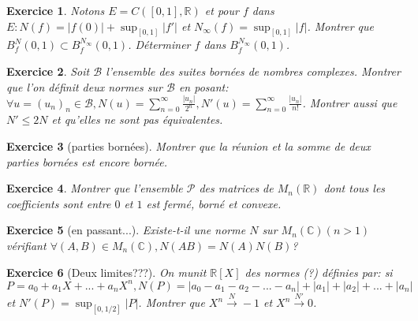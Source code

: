 \documentclass[12pt,a4paper]{article}
\newcommand{\R}{\mathbb{R}}
\newcommand{\C}{\mathbb{C}}
\newcommand{\N}{\mathbb{N}}
\theoremstyle{break}
\theoremstyle{break}
\newtheorem{Exo}{Exercice}
\begin{document}
\begin{Exo}
	Notons $E=C\left([0,1],\R\right)$ et pour $f$ dans $E:N(f)=|f(0)|+\sup_{[0,1]}|f'|$ et $N_{\infty}(f)=\sup_{[0,1]}|f|$. Montrer que $B_f^{N}(0,1)\subset B_f^{N_{\infty}}(0,1)$. Déterminer $f$ dans  $B_f^{N_{\infty}}(0,1)$.
\end{Exo}

\begin{Exo}
	Soit $\mathcal{B}$ l'ensemble des suites bornées de nombres complexes. Montrer que l'on définit deux normes sur $\mathcal{B}$ en posant:
	$\forall u=(u_n)_n\in\mathcal{B},N(u)=\sum_{n=0}^{\infty}\frac{|u_n|}{2^n},N'(u)=\sum_{n=0}^{\infty}\frac{|u_n|}{n!}$. 
	Montrer aussi que $N'\leqslant 2N$ et qu'elles ne sont pas équivalentes.
\end{Exo}



\begin{Exo}[parties bornées]
	Montrer que la réunion et la somme de deux parties bornées est encore bornée.
\end{Exo}

\begin{Exo}
	Montrer que l'ensemble $\mathcal{P}$ des matrices de $M_n(\R)$ dont tous les coefficients sont entre $0$ et $1$ est fermé, borné et convexe.
\end{Exo}

\begin{Exo}[en passant...]
	Existe-t-il une norme $N$ sur $M_n(\C)(n>1)$ vérifiant $\forall(A,B)\in M_n(\C),N(AB)= N(A)N(B)$?
\end{Exo}

\begin{Exo}[Deux limites???]
	On munit $\R[X]$ des normes (?) définies par: si $P=a_0+a_1X+...+a_nX^n,N(P)=|a_0-a_1-a_2-...-a_n|+|a_1|+|a_2|+...+|a_n|$ et $N'(P)=\sup_{[0,1/2]}|P|$. Montrer que $X^n\overset{N}{\to}-1$ et $X^n\overset{N'}{\to}0$.
\end{Exo}
\end{document}
